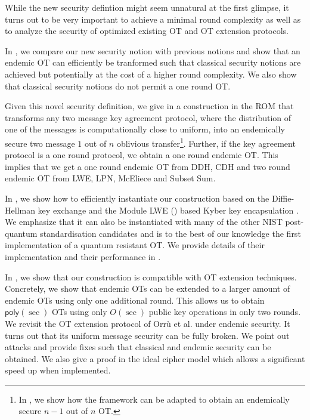 While the new security defintion might seem unnatural at the first glimpse, it turns out to be very important to achieve a minimal round complexity as well as to analyze the security of optimized existing OT and OT extension protocols.

In , we compare our new security notion with previous notions and show that an endemic OT can efficiently  be tranformed such that classical security notions are achieved but potentially at the cost of a higher round complexity. We also show that classical security notions do not permit a one round OT.

Given this novel security definition, we give in  a construction in the ROM that transforms any two message key agreement protocol, where the distribution of one of the messages is computationally close to uniform, into an endemically secure two message $1$ out of $n$ oblivious transfer\footnote{In , we show how the framework can be adapted to obtain an endemically secure $n-1$ out of $n$ OT.}. Further, 
if the key agreement protocol is a one round protocol, we obtain a one round endemic OT. This implies that we get a one round endemic OT from DDH, CDH and two round endemic OT from LWE, LPN, McEliece and Subset Sum.

In , we show how to efficiently instantiate our construction based on the Diffie-Hellman key exchange and the Module LWE (\MLWE) based Kyber key encapsulation \cite{NISTPQC-R1:CRYSTALS-KYBER17}. We emphasize that it can also be instantiated with many of the other NIST post-quantum standardisation candidates and is to the best of our knowledge the first implementation of a quantum resistant OT. We provide details of their implementation and their performance in .

In , we show that our construction is compatible with OT extension techniques. Concretely, we show that endemic OTs can be extended to a larger amount of endemic OTs using only one additional round. This allows us to obtain $\mathsf{poly}(\sec)$ OTs using only $O(\sec)$ public key operations in only two rounds. We revisit the OT extension protocol of Orr{\`u} et al. \cite{RSA:OrrOrsSch17} under endemic security. It turns out that its uniform message security can be fully broken. We point out attacks and provide fixes such that classical and endemic security can be obtained. We also give a proof in the ideal cipher model which allows a significant speed up when implemented.


